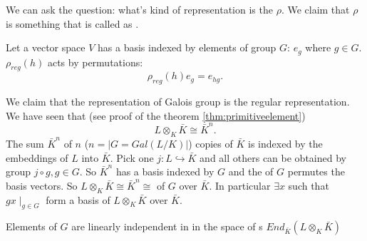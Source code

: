 We can ask the question: what's kind of representation is the
$\rho$. We claim that $\rho$ is something that is called as
.
\begin{definition}
  Let a vector space $V$ has a basis indexed by elements of group $G$:
  $e_g$ where $g \in G$. $\rho_{reg}\left(h\right)$ acts by
  permutations:
  \[
  \rho_{reg}\left(h\right) e_g = e_{hg}.
  \]
  \label{def:regularrepresentation}
\end{definition}

We claim that the representation of Galois group is the regular
representation. We have seen that (see proof of the theorem
\ref{thm:primitiveelement}) 
\[
L \otimes_K \bar{K} \cong \bar{K}^n.
\]
The sum $\bar{K}^n$ of $n$ ($n = \left|G = Gal\left(L/K\right)\right|$)
copies of $\bar{K}$ is indexed by the embeddings of $L$ into
$\bar{K}$. Pick one $j: L \hookrightarrow \bar{K}$ and all others can
be obtained by group  $j \circ g, g \in G$. So
$\bar{K}^n$ has a basis indexed by $G$ and the  of
$G$ permutes the basis vectors. So $L \otimes_K \bar{K} \cong
\bar{K}^n \cong$  of $G$ over
$\bar{K}$. In particular $\exists x$ such that $gx \mid_{g \in G}$
form a basis of $L \otimes_K \bar{K}$ over $\bar{K}$.

Elements of $G$ are linearly independent in in the space of
s
$End_{\bar{K}}\left(L \otimes_K \bar{K}\right)$

